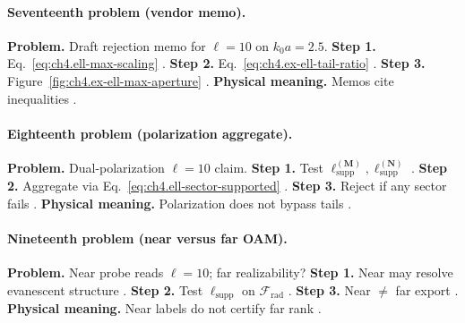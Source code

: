 \paragraph{Seventeenth problem (vendor memo).}
\textbf{Problem.} Draft rejection memo for \(\ell=10\) on \(k_{0}a=2.5\).
\textbf{Step 1.} Eq.~\eqref{eq:ch4.ell-max-scaling} \cite{hansen1988,jackson1999,harrington2001,stratton1941,devaney2004}.
\textbf{Step 2.} Eq.~\eqref{eq:ch4.ex-ell-tail-ratio} \cite{harrington2001,stratton1941,hansen1988,devaney2004,jackson1999}.
\textbf{Step 3.} Figure~\ref{fig:ch4.ex-ell-max-aperture} \cite{stratton1941,jackson1999,harrington2001,devaney2004,hansen1988}.
\textbf{Physical meaning.} Memos cite inequalities \cite{harrington2001,stratton1941,hansen1988,devaney2004,jackson1999}.

\paragraph{Eighteenth problem (polarization aggregate).}
\textbf{Problem.} Dual-polarization \(\ell=10\) claim.
\textbf{Step 1.} Test \(\ell_{\mathrm{supp}}^{(\mathbf{M})},\ell_{\mathrm{supp}}^{(\mathbf{N})}\) \cite{harrington2001,hansen1988,stratton1941,devaney2004,jackson1999}.
\textbf{Step 2.} Aggregate via Eq.~\eqref{eq:ch4.ell-sector-supported} \cite{harrington2001,stratton1941,hansen1988,devaney2004}.
\textbf{Step 3.} Reject if any sector fails \cite{jackson1999,harrington2001,stratton1941,devaney2004,hansen1988}.
\textbf{Physical meaning.} Polarization does not bypass tails \cite{stratton1941,harrington2001,hansen1988,devaney2004,jackson1999}.

\paragraph{Nineteenth problem (near versus far OAM).}
\textbf{Problem.} Near probe reads \(\ell=10\); far realizability?
\textbf{Step 1.} Near may resolve evanescent structure \cite{harrington2001,stratton1941,devaney2004,hansen1988,jackson1999}.
\textbf{Step 2.} Test \(\ell_{\mathrm{supp}}\) on \(\mathcal{F}_{\mathrm{rad}}\) \cite{hansen1988,jackson1999,harrington2001,stratton1941,devaney2004}.
\textbf{Step 3.} Near \(\neq\) far export \cite{stratton1941,harrington2001,devaney2004,hansen1988,jackson1999}.
\textbf{Physical meaning.} Near labels do not certify far rank \cite{harrington2001,stratton1941,hansen1988,devaney2004,jackson1999}.

